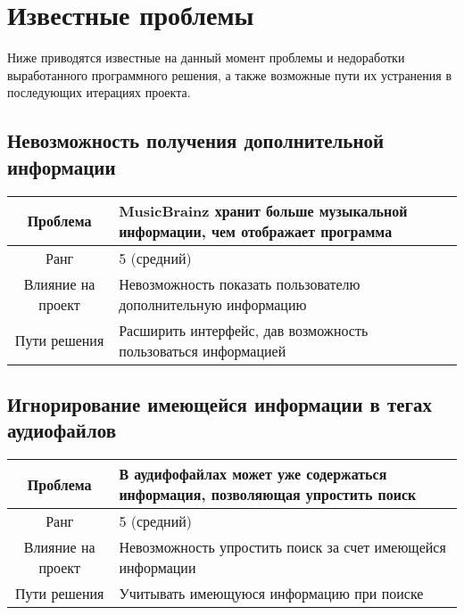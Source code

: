\documentclass[pdftex,12pt,a4paper]{report}
\begin{document}
\newpage
\section{Известные проблемы}
Ниже приводятся известные на данный момент проблемы и недоработки выработанного программного решения, а также возможные пути их устранения в последующих итерациях проекта.

\subsection{Невозможность получения дополнительной информации}
\begin{table}[h]
\begin{tabular}{|c|p{10cm}|} \hline
\cellcolor[gray]{0.9} Проблема  & MusicBrainz хранит больше музыкальной информации, чем отображает программа \\ \hline
\cellcolor[gray]{0.9} Ранг  & 5 (средний) \\ \hline
\cellcolor[gray]{0.9} Влияние на проект & Невозможность показать пользователю дополнительную информацию \\ \hline
\cellcolor[gray]{0.9} Пути решения  & Расширить интерфейс, дав возможность пользоваться информацией\\ \hline
\end{tabular}
\end{table}

\subsection{Игнорирование имеющейся информации в тегах аудиофайлов}
\begin{table}[h]
\begin{tabular}{|c|p{10cm}|} \hline
\cellcolor[gray]{0.9} Проблема  & В аудифофайлах может уже содержаться информация, позволяющая упростить поиск \\ \hline
\cellcolor[gray]{0.9} Ранг  & 5 (средний) \\ \hline
\cellcolor[gray]{0.9} Влияние на проект & Невозможность упростить поиск за счет имеющейся информации \\ \hline
\cellcolor[gray]{0.9} Пути решения  & Учитывать имеющуюся информацию при поиске \\ \hline
\end{tabular}
\end{table}
\end{document}
